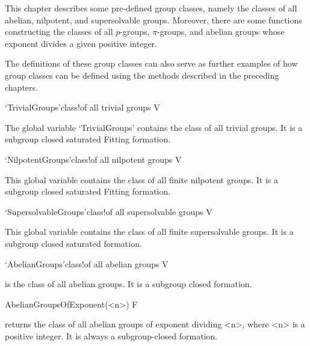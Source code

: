 
This chapter describes some pre-defined 
group classes, namely the classes of all abelian, nilpotent, and supersolvable
groups. Moreover, there are some functions constructing the classes of all
$p$-groups, $\pi$-groups, and abelian groups whose exponent divides a given
positive integer. 

The definitions of these group classes can also serve as further examples of
how group classes can be defined using the methods described in the preceding
chapters.

\null

\>`TrivialGroups'{class}!{of all trivial groups} V

%
The global variable `TrivialGroups' contains the class of all trivial groups. It is a
subgroup closed saturated Fitting formation.

\>`NilpotentGroups'{class}!{of all nilpotent groups} V

%
%
This global variable contains the class of all finite nilpotent groups. It is a
subgroup closed saturated Fitting formation.


\>`SupersolvableGroups'{class}!{of all supersolvable groups} V

%
%
This global variable contains the class of all finite supersolvable groups. It
is a subgroup closed saturated formation.


\>`AbelianGroups'{class}!{of all abelian groups} V

%
%
is the class of all abelian groups. It is a subgroup closed formation.


\>AbelianGroupsOfExponent(<n>) F

returns the class of all abelian groups of exponent dividing <n>, 
where <n> is
a positive integer. It is always a subgroup-closed formation.


